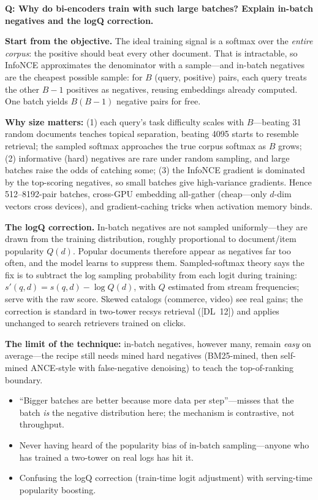 \begin{interviewq}
\textbf{Q: Why do bi-encoders train with such large batches? Explain in-batch negatives and the logQ correction.}

 \quad {} \quad \badgefreq{\freqmed}

\stronganswer

\textbf{Start from the objective.} The ideal training signal is a softmax over the \textit{entire corpus}: the positive should beat every other document. That is intractable, so InfoNCE approximates the denominator with a sample---and in-batch negatives are the cheapest possible sample: for $B$ (query, positive) pairs, each query treats the other $B-1$ positives as negatives, reusing embeddings already computed. One batch yields $B(B-1)$ negative pairs for free.

\textbf{Why size matters:} (1) each query's task difficulty scales with $B$---beating 31 random documents teaches topical separation, beating 4095 starts to resemble retrieval; the sampled softmax approaches the true corpus softmax as $B$ grows; (2) informative (hard) negatives are rare under random sampling, and large batches raise the odds of catching some; (3) the InfoNCE gradient is dominated by the top-scoring negatives, so small batches give high-variance gradients. Hence 512--8192-pair batches, cross-GPU embedding all-gather (cheap---only $d$-dim vectors cross devices), and gradient-caching tricks when activation memory binds.

\textbf{The logQ correction.} In-batch negatives are not sampled uniformly---they are drawn from the training distribution, roughly proportional to document/item popularity $Q(d)$. Popular documents therefore appear as negatives far too often, and the model learns to suppress them. Sampled-softmax theory says the fix is to subtract the log sampling probability from each logit during training: $s'(q,d) = s(q,d) - \log Q(d)$, with $Q$ estimated from stream frequencies; serve with the raw score. Skewed catalogs (commerce, video) see real gains; the correction is standard in two-tower recsys retrieval ([DL~12]) and applies unchanged to search retrievers trained on clicks.

\textbf{The limit of the technique:} in-batch negatives, however many, remain \textit{easy} on average---the recipe still needs mined hard negatives (BM25-mined, then self-mined ANCE-style with false-negative denoising) to teach the top-of-ranking boundary.

\redflags
\begin{itemize}
    \item ``Bigger batches are better because more data per step''---misses that the batch \textit{is} the negative distribution here; the mechanism is contrastive, not throughput.
    \item Never having heard of the popularity bias of in-batch sampling---anyone who has trained a two-tower on real logs has hit it.
    \item Confusing the logQ correction (train-time logit adjustment) with serving-time popularity boosting.
\end{itemize}


\end{interviewq}
